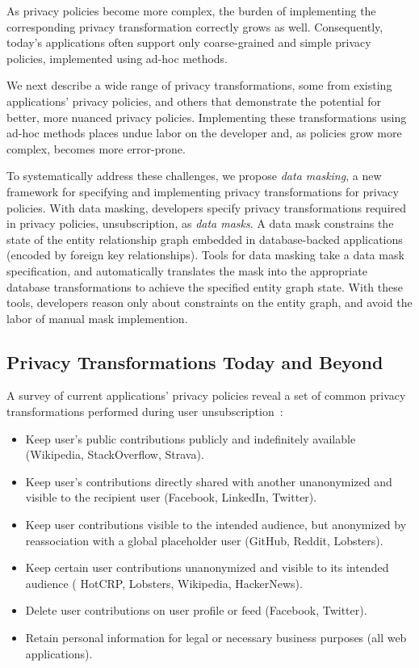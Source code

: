 As privacy policies become more complex, the burden of implementing the corresponding privacy
transformation correctly grows as well.
Consequently, today's applications often support only coarse-grained and simple privacy policies,
implemented using ad-hoc methods.

We next describe a wide range of privacy transformations, some from existing applications' privacy policies,
and others that demonstrate the potential for better, more nuanced privacy policies. Implementing
these transformations using ad-hoc methods places undue labor on the developer and, as policies grow
more complex, becomes more error-prone.

To systematically address these challenges, we propose \emph{data masking}, a new framework for
specifying and implementing privacy transformations for privacy policies. 
%
With data masking, developers specify privacy transformations required in privacy policies, \eg
unsubscription, as \emph{data masks}. A data mask constrains the state of the entity relationship
graph embedded in database-backed applications (\eg encoded by foreign key relationships).
%
Tools for data masking take a data mask specification, and automatically translates the mask into
the appropriate database transformations to achieve the specified entity graph state. With these
tools, developers reason only about constraints on the entity graph, and avoid the labor of manual
mask implemention.

\subsection{Privacy Transformations Today and Beyond}
A survey of current applications' privacy policies reveal a set of common privacy transformations performed during user unsubscription~\cite{facebook:privacy, twitter:privacy, hotcrp:privacy, reddit:privacy,
github:privacy, hackernews:privacy, strava:privacy, linkedin:privacy, stackoverflow:privacy,
wikipedia:privacy, amazon:privacy, prestashop:privacy, spotify:privacy, lobsters:privacy}:
\begin{itemize}
    \item Keep user's public contributions publicly and indefinitely available (\eg Wikipedia, StackOverflow, Strava).
    \item Keep user's contributions directly shared with another unanonymized and visible to the recipient user (\eg Facebook,
        LinkedIn, Twitter).
    \item Keep user contributions visible to the intended audience, but anonymized by reassociation with a global
        placeholder user (\eg GitHub, Reddit, Lobsters).
    \item Keep certain user contributions unanonymized and visible to its intended audience (\eg
        HotCRP, Lobsters, Wikipedia, HackerNews).
    \item Delete user contributions on user profile or feed (\eg Facebook, Twitter).
    \item Retain personal information for legal or necessary business purposes (all web applications).
\end{itemize}

